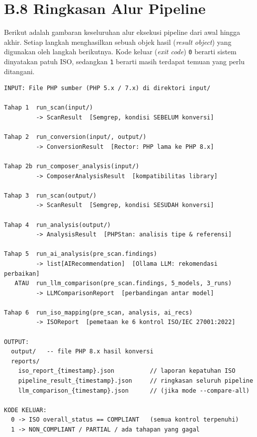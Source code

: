 \section*{B.8 Ringkasan Alur Pipeline}

Berikut adalah gambaran keseluruhan alur eksekusi pipeline dari awal hingga
akhir. Setiap langkah menghasilkan sebuah objek hasil (\textit{result object})
yang digunakan oleh langkah berikutnya. Kode keluar (\textit{exit code})
\texttt{0} berarti sistem dinyatakan patuh ISO, sedangkan \texttt{1} berarti
masih terdapat temuan yang perlu ditangani.

\begin{lstlisting}[style=pseudocodestyle]
INPUT: File PHP sumber (PHP 5.x / 7.x) di direktori input/

Tahap 1  run_scan(input/)
         -> ScanResult  [Semgrep, kondisi SEBELUM konversi]

Tahap 2  run_conversion(input/, output/)
         -> ConversionResult  [Rector: PHP lama ke PHP 8.x]

Tahap 2b run_composer_analysis(input/)
         -> ComposerAnalysisResult  [kompatibilitas library]

Tahap 3  run_scan(output/)
         -> ScanResult  [Semgrep, kondisi SESUDAH konversi]

Tahap 4  run_analysis(output/)
         -> AnalysisResult  [PHPStan: analisis tipe & referensi]

Tahap 5  run_ai_analysis(pre_scan.findings)
         -> list[AIRecommendation]  [Ollama LLM: rekomendasi perbaikan]
   ATAU  run_llm_comparison(pre_scan.findings, 5_models, 3_runs)
         -> LLMComparisonReport  [perbandingan antar model]

Tahap 6  run_iso_mapping(pre_scan, analysis, ai_recs)
         -> ISOReport  [pemetaan ke 6 kontrol ISO/IEC 27001:2022]

OUTPUT:
  output/   -- file PHP 8.x hasil konversi
  reports/
    iso_report_{timestamp}.json          // laporan kepatuhan ISO
    pipeline_result_{timestamp}.json     // ringkasan seluruh pipeline
    llm_comparison_{timestamp}.json      // (jika mode --compare-all)

KODE KELUAR:
  0 -> ISO overall_status == COMPLIANT   (semua kontrol terpenuhi)
  1 -> NON_COMPLIANT / PARTIAL / ada tahapan yang gagal
\end{lstlisting}
